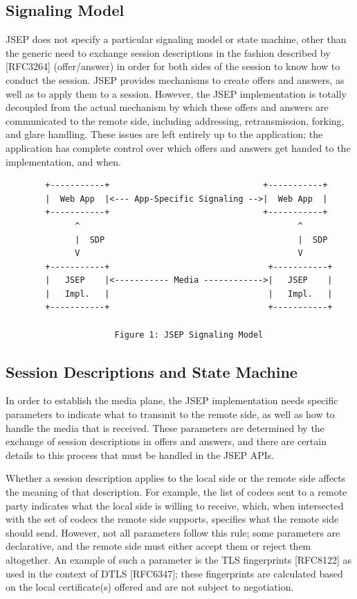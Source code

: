 \documentclass{article}
\begin{document}
\subsection{Signaling Model}

JSEP does not specify a particular signaling model or state machine,
other than the generic need to exchange session descriptions in the
fashion described by [RFC3264] (offer/answer) in order for both sides
of the session to know how to conduct the session.  JSEP provides
mechanisms to create offers and answers, as well as to apply them to
a session.  However, the JSEP implementation is totally decoupled
from the actual mechanism by which these offers and answers are
communicated to the remote side, including addressing,
retransmission, forking, and glare handling.  These issues are left
entirely up to the application; the application has complete control
over which offers and answers get handed to the implementation, and
when.

\begin{verbatim}
        +-----------+                               +-----------+
        |  Web App  |<--- App-Specific Signaling -->|  Web App  |
        +-----------+                               +-----------+
              ^                                            ^
              |  SDP                                       |  SDP
              V                                            V
        +-----------+                                +-----------+
        |   JSEP    |<----------- Media ------------>|   JSEP    |
        |   Impl.   |                                |   Impl.   |
        +-----------+                                +-----------+

                      Figure 1: JSEP Signaling Model
\end{verbatim}

\subsection{Session Descriptions and State Machine}

In order to establish the media plane, the JSEP implementation needs
specific parameters to indicate what to transmit to the remote side,
as well as how to handle the media that is received.  These
parameters are determined by the exchange of session descriptions in
offers and answers, and there are certain details to this process
that must be handled in the JSEP APIs.

Whether a session description applies to the local side or the remote
side affects the meaning of that description.  For example, the list
of codecs sent to a remote party indicates what the local side is
willing to receive, which, when intersected with the set of codecs
the remote side supports, specifies what the remote side should send.
However, not all parameters follow this rule; some parameters are
declarative, and the remote side must either accept them or reject
them altogether.  An example of such a parameter is the TLS
fingerprints [RFC8122] as used in the context of DTLS [RFC6347];
these fingerprints are calculated based on the local certificate(s)
offered and are not subject to negotiation.
\end{document}
